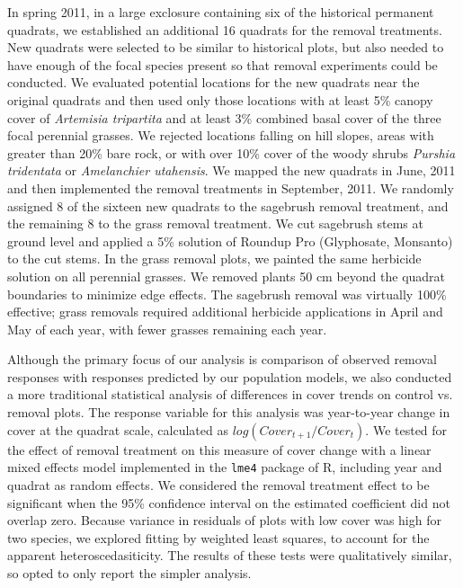 \documentclass[11pt]{article}
\begin{document}
\begin{doublespacing}
In spring 2011, in a large exclosure containing six of the historical permanent quadrats, we established an additional 16 quadrats for the removal treatments. New quadrats were selected to be similar to historical plots, but also needed to have enough of the focal species present so that removal experiments could be conducted. We evaluated potential locations for the new quadrats near the original quadrats and then used only those locations with at least 5\% canopy cover of \textit{Artemisia tripartita} and at least 3\% combined basal cover of the three focal perennial grasses. We rejected locations falling on hill slopes, areas with greater than 20\% bare rock, or with over 10\% cover of the woody shrubs \textit{Purshia tridentata} or \textit{Amelanchier utahensis}. We mapped the new quadrats in June, 2011 and then implemented the removal treatments in September, 2011. We randomly assigned 8 of the sixteen new quadrats to the sagebrush removal treatment, and the remaining 8 to the grass removal treatment. We cut sagebrush stems at ground level and applied a 5\% solution of Roundup Pro (Glyphosate, Monsanto) to the cut stems. In the grass removal plots, we painted the same herbicide solution on all perennial grasses. We removed plants 50 cm beyond the quadrat boundaries to minimize edge effects. The sagebrush removal was virtually 100\% effective; grass removals required additional herbicide applications in April and May of each year, with fewer grasses remaining each year.

Although the primary focus of our analysis is comparison of observed removal responses with responses predicted by our population models, we also conducted a more traditional statistical analysis of differences in cover trends on control vs. removal plots. The response variable for this analysis was year-to-year change in cover at the quadrat scale, calculated as $log(Cover_{t+1}/Cover_t)$. We tested for the effect of removal treatment on this measure of cover change with a linear mixed effects model implemented in the \texttt{lme4} package \citep{Bates2015} of R, including year and quadrat as random effects. We considered the removal treatment effect to be significant when the 95\% confidence interval on the estimated coefficient did not overlap zero.  Because variance in residuals of plots with low cover was high for two species, we explored fitting by weighted least squares, to account for the apparent heteroscedasiticity. The results of these tests were qualitatively similar, so opted to only report the simpler analysis.


\end{doublespacing}
\end{document}
